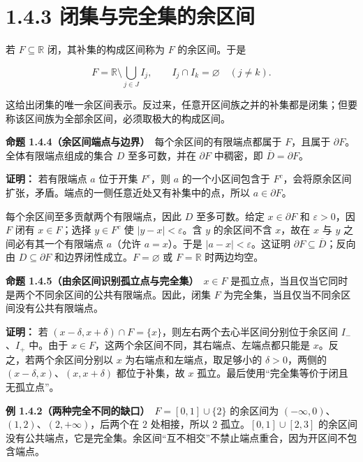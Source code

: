 \documentclass[11pt,a4paper]{article}
\begin{document}
\section[\S{}1.4.3
闭集与完全集的余区间]{1.4.3
闭集与完全集的余区间}\label{ux95edux96c6ux4e0eux5b8cux5168ux96c6ux7684ux4f59ux533aux95f4}

若 \(F\subseteq\mathbb R\) 闭，其补集的构成区间称为 \(F\) 的余区间。于是

\begin{equation*}
F=\mathbb R\setminus\bigcup_{j\in J}I_j,
\qquad I_j\cap I_k=\varnothing\quad(j\ne k).
\tag{1.4.2}
\end{equation*}

这给出闭集的唯一余区间表示。反过来，任意开区间族之并的补集都是闭集；但要称该区间族为全部余区间，必须取极大的构成区间。

\textbf{命题 1.4.4（余区间端点与边界）}　每个余区间的有限端点都属于
\(F\)，且属于 \(\partial F\)。全体有限端点组成的集合 \(D\)
至多可数，并在 \(\partial F\) 中稠密，即 \(\overline D=\partial F\)。

\textbf{证明：} 若有限端点 \(a\) 位于开集 \(F^c\)，则 \(a\)
的一个小区间包含于
\(F^c\)，会将原余区间扩张，矛盾。端点的一侧任意近处又有补集中的点，所以
\(a\in\partial F\)。

每个余区间至多贡献两个有限端点，因此 \(D\) 至多可数。给定
\(x\in\partial F\) 和 \(\varepsilon>0\)，因 \(F\) 闭有 \(x\in F\)；选择
\(y\in F^c\) 使 \(|y-x|<\varepsilon\)。含 \(y\) 的余区间不含 \(x\)，故在
\(x\) 与 \(y\) 之间必有其一个有限端点 \(a\)（允许 \(a=x\)）。于是
\(|a-x|<\varepsilon\)。这证明 \(\partial F\subseteq\overline D\)；反向由
\(D\subseteq\partial F\) 和边界闭性成立。\(F=\varnothing\) 或
\(F=\mathbb R\) 时两边均空。

\textbf{命题 1.4.5（由余区间识别孤立点与完全集）}　\(x\in F\)
是孤立点，当且仅当它同时是两个不同余区间的公共有限端点。因此，闭集 \(F\)
为完全集，当且仅当不同余区间没有公共有限端点。

\textbf{证明：} 若
\((x-\delta,x+\delta)\cap F=\{x\}\)，则左右两个去心半区间分别位于余区间
\(I_-\)、\(I_+\) 中。由于
\(x\in F\)，这两个余区间不同，其右端点、左端点都只能是
\(x\)。反之，若两个余区间分别以 \(x\) 为右端点和左端点，取足够小的
\(\delta>0\)，两侧的 \((x-\delta,x)\)、\((x,x+\delta)\) 都位于补集，故
\(x\) 孤立。最后使用``完全集等价于闭且无孤立点''。

\textbf{例 1.4.2（两种完全不同的缺口）}　\(F=[0,1]\cup\{2\}\) 的余区间为
\((-\infty,0)\)、\((1,2)\)、\((2,+\infty)\)，后两个在 \(2\) 处相接，所以
\(2\) 孤立。\([0,1]\cup[2,3]\)
的余区间没有公共端点，它是完全集。余区间``互不相交''不禁止端点重合，因为开区间不包含端点。
\end{document}
